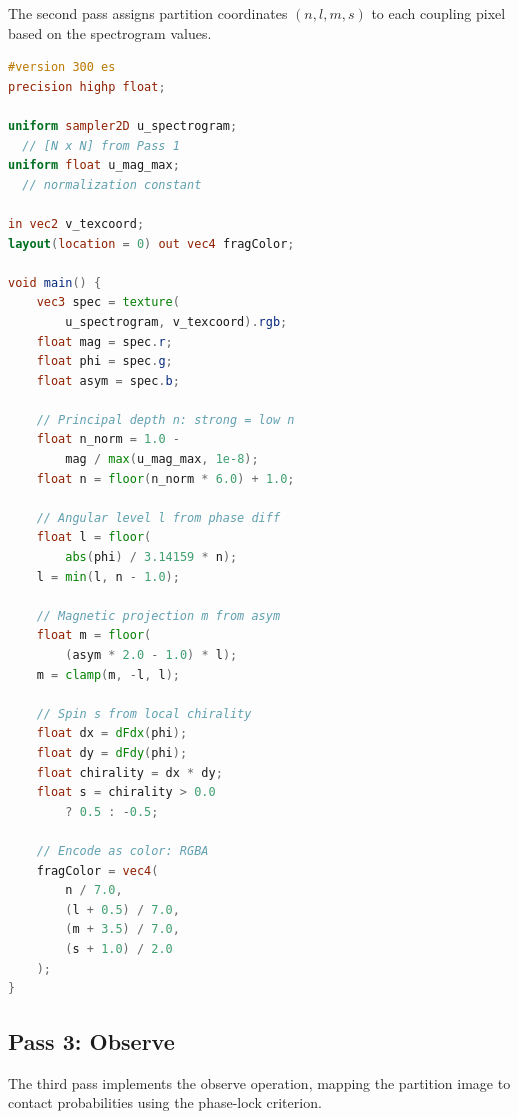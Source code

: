 \documentclass[11pt,twocolumn,a4paper]{article}
\theoremstyle{definition}
\theoremstyle{remark}
\begin{document}
The second pass assigns partition coordinates $(n, l, m, s)$ to each coupling pixel based on the spectrogram values.

\begin{lstlisting}[language=GLSL,caption={Pass 2: Partition coordinate assignment},label=lst:pass2]
#version 300 es
precision highp float;

uniform sampler2D u_spectrogram;
  // [N x N] from Pass 1
uniform float u_mag_max;
  // normalization constant

in vec2 v_texcoord;
layout(location = 0) out vec4 fragColor;

void main() {
    vec3 spec = texture(
        u_spectrogram, v_texcoord).rgb;
    float mag = spec.r;
    float phi = spec.g;
    float asym = spec.b;

    // Principal depth n: strong = low n
    float n_norm = 1.0 -
        mag / max(u_mag_max, 1e-8);
    float n = floor(n_norm * 6.0) + 1.0;

    // Angular level l from phase diff
    float l = floor(
        abs(phi) / 3.14159 * n);
    l = min(l, n - 1.0);

    // Magnetic projection m from asym
    float m = floor(
        (asym * 2.0 - 1.0) * l);
    m = clamp(m, -l, l);

    // Spin s from local chirality
    float dx = dFdx(phi);
    float dy = dFdy(phi);
    float chirality = dx * dy;
    float s = chirality > 0.0
        ? 0.5 : -0.5;

    // Encode as color: RGBA
    fragColor = vec4(
        n / 7.0,
        (l + 0.5) / 7.0,
        (m + 3.5) / 7.0,
        (s + 1.0) / 2.0
    );
}
\end{lstlisting}

\subsection{Pass 3: Observe}

The third pass implements the observe operation, mapping the partition image to contact probabilities using the phase-lock criterion.
\end{document}
